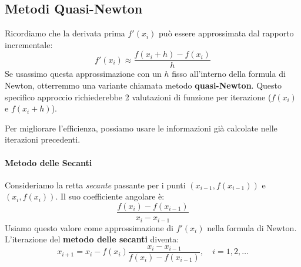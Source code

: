 \subsection{Metodi Quasi-Newton}
Ricordiamo che la derivata prima $f'(x_i)$ può essere approssimata dal rapporto incrementale:
$$ f'(x_i) \approx \frac{f(x_i+h) - f(x_i)}{h} $$
Se usassimo questa approssimazione con un $h$ fisso all'interno della formula di Newton, otterremmo una variante chiamata metodo \textbf{quasi-Newton}. Questo specifico approccio richiederebbe 2 valutazioni di funzione per iterazione ($f(x_i)$ e $f(x_i+h)$).

Per migliorare l'efficienza, possiamo usare le informazioni già calcolate nelle iterazioni precedenti.

\paragraph{Metodo delle Secanti}
Consideriamo la retta \emph{secante} passante per i punti $(x_{i-1}, f(x_{i-1}))$ e $(x_i, f(x_i))$. Il suo coefficiente angolare è:
$$ \frac{f(x_i) - f(x_{i-1})}{x_i - x_{i-1}} $$
Usiamo questo valore come approssimazione di $f'(x_i)$ nella formula di Newton. L'iterazione del \textbf{metodo delle secanti} diventa:
$$ x_{i+1} = x_i - f(x_i) \frac{x_i - x_{i-1}}{f(x_i) - f(x_{i-1})}, \quad i=1, 2, \dots $$

